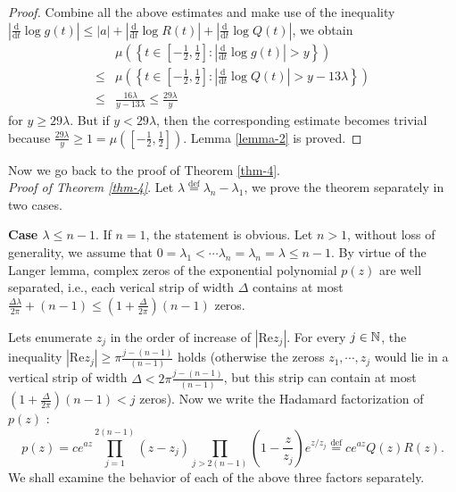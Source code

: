 \begin{proof}
  Combine all the above estimates and make use of the inequality $\left| \frac{\mathrm{d}}{\mathrm{d}t}\log g(t) \right| \le \left| a \right| + \left| \frac{\mathrm{d}}{\mathrm{d}t}\log R(t) \right| +\left| \frac{\mathrm{d}}{\mathrm{d}t}\log Q(t) \right| $, we obtain
  \begin{equation*}
    \begin{aligned}
       & \mu\left(\left\{ t\in \left[ -\frac{1}{2},\frac{1}{2} \right] :\left| \frac{\mathrm{d}}{\mathrm{d}t}\log g(t) \right| >y\right\} \right)\\
       \le & \mu\left( \left\{ t\in \left[ -\frac{1}{2},\frac{1}{2} \right] :\left| \frac{\mathrm{d}}{\mathrm{d}t}\log Q(t) \right| >y-13\lambda \right\} \right) \\
       \le & \frac{16\lambda}{y-13\lambda}\le \frac{29\lambda}{y}
    \end{aligned}
  \end{equation*}
  for $y\ge  29\lambda$. But if $y<29\lambda$, then the corresponding estimate becomes trivial because $\frac{29\lambda}{y}\ge 1=\mu \left( \left[ -\frac{1}{2},\frac{1}{2} \right]  \right) $. Lemma \ref{lemma-2} is proved.
\end{proof}


Now we go back to the proof of Theorem \ref{thm-4}.\\
{\itshape Proof of Theorem \ref{thm-4}}. Let $\lambda  \overset{\mathrm{def}}{=}\lambda_n-\lambda_1$, we prove the theorem separately in two cases.

\textbf{Case $\lambda \le  n-1$}. If $n=1$, the statement is obvious. Let $n>1$, without loss of generality, we assume that $0=\lambda_1<\cdots\lambda_n=\lambda_n=\lambda\le n-1$. By virtue of the Langer lemma, complex zeros of the exponential polynomial $p(z)$ are well separated, i.e., each verical strip of width $\Delta$ contains at most $ \frac{\Delta\lambda}{2\pi}+(n-1)\le \left( 1+ \frac{\Delta}{2\pi} \right) (n-1)$ zeros. 

Lets enumerate $z_j$ in the order of increase of $\left| \text{Re}z_j \right| $. For every $j \in \mathbb{N}$, the inequality $\left| \text{Re}z_j \right| \ge \pi \frac{j-(n-1)}{(n-1)}$ holds (otherwise the zeross $z_1,\cdots,z_j$ would lie in a vertical strip of width $\Delta <2\pi \frac{j-(n-1)}{(n-1)}$, but this strip can contain at most $\left( 1+ \frac{\Delta}{2\pi} \right) (n-1)<j$ zeros). Now we write the Hadamard factorization of $p(z)$ :
\[
  p(z)=ce^{az}\prod_{j=1}^{2(n-1)}\left( z-z_j \right) \prod_{j>2(n-1)}\left( 1-\frac{z}{z_j} \right) e^{z /z_j}\overset{\mathrm{def}}{=}ce^{az}Q(z)R(z).
\] 
We shall examine the behavior of each of the above three factors separately.


